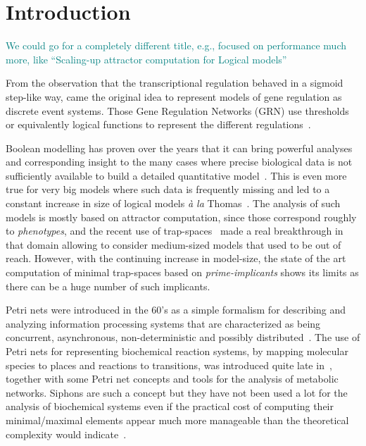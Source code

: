 \documentclass[runningheads]{llncs}
\newcommand{\sylvain}[1]{\textcolor{teal}{#1}}
\begin{document}
\section{Introduction}

\sylvain{We could go for a completely different title, e.g., focused on performance much more, like ``Scaling-up attractor computation for Logical models''}

From the observation that the transcriptional regulation behaved in a sigmoid step-like way, came the original idea to represent models of gene regulation as discrete event systems.
Those Gene Regulation Networks (GRN) use thresholds or equivalently logical functions to represent the different regulations~\cite{glass1973logical,thomas1973boolean,thomas1990biological,thomas1991regulatory}.

Boolean modelling has proven over the years that it can bring powerful analyses and corresponding insight to the many cases where precise biological data is not sufficiently available to build a detailed quantitative model~\cite{wang2012boolean}.
This is even more true for very big models where such data is frequently missing and led to a constant increase in size of logical models \emph{à la} Thomas~\cite{aghamiri2020automated}.
The analysis of such models is mostly based on attractor computation, since those correspond roughly to \emph{phenotypes}, and the recent use of trap-spaces~\cite{klarner2015computing} made a real breakthrough in that domain allowing to consider medium-sized models that used to be out of reach.
However, with the continuing increase in model-size, the state of the art computation of minimal trap-spaces based on \emph{prime-implicants} shows its limits as there can be a huge number of such implicants.

Petri nets were introduced in the 60’s as a simple formalism for describing and analyzing information processing systems that are characterized as being concurrent, asynchronous, non-deterministic and possibly distributed~\cite{peterson1981petri,Murata1989}.
The use of Petri nets for representing biochemical reaction systems, by mapping molecular species to places and reactions to transitions, was introduced quite late in~\cite{reddy1993petri}, together with some Petri net concepts and tools for the analysis of metabolic networks.
Siphons are such a concept but they have not been used a lot for the analysis of biochemical systems even if the practical cost of computing their minimal/maximal elements appear much more manageable than the theoretical complexity would indicate~\cite{nabli2016enumerating}.
\end{document}
